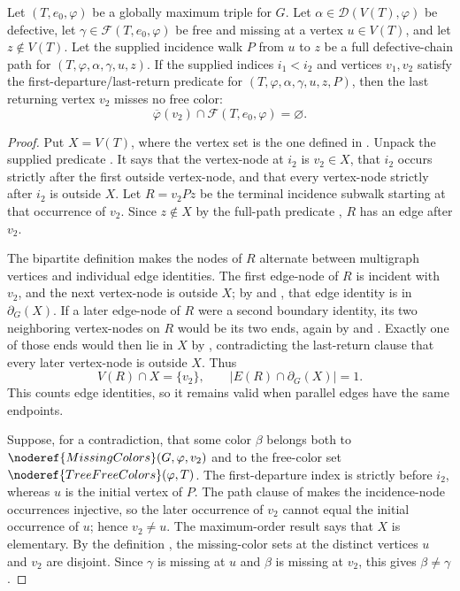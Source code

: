 \begin{lemma}
Let $(T,e_0,\varphi)$ be a globally maximum triple for $G$.  Let
$\alpha\in\mathcal D(V(T),\varphi)$ be defective, let
$\gamma\in\mathcal F(T,e_0,\varphi)$ be free and missing at a vertex
$u\in V(T)$, and let $z\notin V(T)$.  Let the supplied incidence walk $P$
from $u$ to $z$ be a full defective-chain path for
$(T,\varphi,\alpha,\gamma,u,z)$.  If the supplied indices $i_1<i_2$ and
vertices $v_1,v_2$ satisfy the first-departure/last-return predicate for
$(T,\varphi,\alpha,\gamma,u,z,P)$, then the last returning vertex $v_2$
misses no free color:
\[
 \overline\varphi(v_2)\cap\mathcal F(T,e_0,\varphi)=\varnothing.
\]
\end{lemma}
\begin{proof}
Put $X=V(T)$, where the vertex set is the one defined in
.  Unpack the supplied predicate
.  It says that the vertex-node at $i_2$
is $v_2\in X$, that $i_2$ occurs strictly after the first outside
vertex-node, and that every vertex-node strictly after $i_2$ is outside
$X$.  Let $R=v_2Pz$ be the terminal incidence subwalk starting at that
occurrence of $v_2$.  Since $z\notin X$ by the full-path predicate
, $R$ has an edge after $v_2$.

The bipartite definition  makes the nodes
of $R$ alternate between multigraph vertices and individual edge
identities.  The first edge-node of $R$ is incident with $v_2$, and the
next vertex-node is outside $X$; by  and
, that edge identity is in $\partial_G(X)$.  If a
later edge-node of $R$ were a second boundary identity, its two neighboring
vertex-nodes on $R$ would be its two ends, again by
 and .  Exactly one of
those ends would then lie in $X$ by , contradicting
the last-return clause that every later vertex-node is outside $X$.
Thus
\[
 V(R)\cap X=\{v_2\},\qquad
 |E(R)\cap\partial_G(X)|=1.                                      \tag{1}
\]
This counts edge identities, so it remains valid when parallel edges have
the same endpoints.

Suppose, for a contradiction, that some color $\beta$ belongs both to
$\noderef{MissingColors}(G,\varphi,v_2)$ and to the free-color set
$\noderef{TreeFreeColors}(\varphi,T)$.  The first-departure index is
strictly before $i_2$, whereas $u$ is the initial vertex of $P$.  The path
clause of  makes the incidence-node
occurrences injective, so the later occurrence of $v_2$ cannot equal the
initial occurrence of $u$; hence $v_2\ne u$.  The maximum-order result
 says that $X$ is elementary.  By the
definition , the missing-color sets
at the distinct vertices $u$ and $v_2$ are disjoint.  Since $\gamma$ is
missing at $u$ and $\beta$ is missing at $v_2$, this gives
$\beta\ne\gamma$.


\end{proof}
